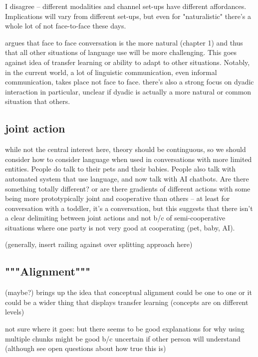 \documentclass[]{article}
\begin{document}
I disagree -- different modalities and channel set-ups have different affordances. Implications will vary from different set-ups, but even for "naturalistic" there's a whole lot of not face-to-face these days. 

\cite{clark1996} argues that face to face conversation is the more natural (chapter 1) and thus that all other situations of language use will be more challenging. This goes against idea of transfer learning or ability to adapt to other situations. Notably, in the current world, a lot of linguistic communication, even informal communication, takes place not face to face. there's also a strong focus on dyadic interaction in particular, unclear if dyadic is actually a more natural or common situation that others.

\subsection{joint action}
\cite{clark1996} while not the central interest here, theory should be continguous, so we should consider how to consider language when used in conversations with more limited entities. People do talk to their pets and their babies. People also talk with automated system that use language, and now talk with AI chatbots. Are there something totally different? or are there gradients of different actions with some being more prototypically joint and cooperative than others -- at least for conversation with a toddler, it's a conversation, but this suggests that there isn't a clear delimiting between joint actions and not b/c of semi-cooperative situations where one party is not very good at cooperating (pet, baby, AI). 

(generally, insert railing against over splitting approach here)


\subsection{"""Alignment"""}

\cite{eliav2023} (maybe?) brings up the idea that conceptual alignment could be one to one or it could be a wider thing that displays transfer learning (concepts are on different levels) 

not sure where it goes: but there seems to be good explanations for why using multiple chunks might be good b/c uncertain if other person will understand (although see open questions about how true this is) 
\end{document}
